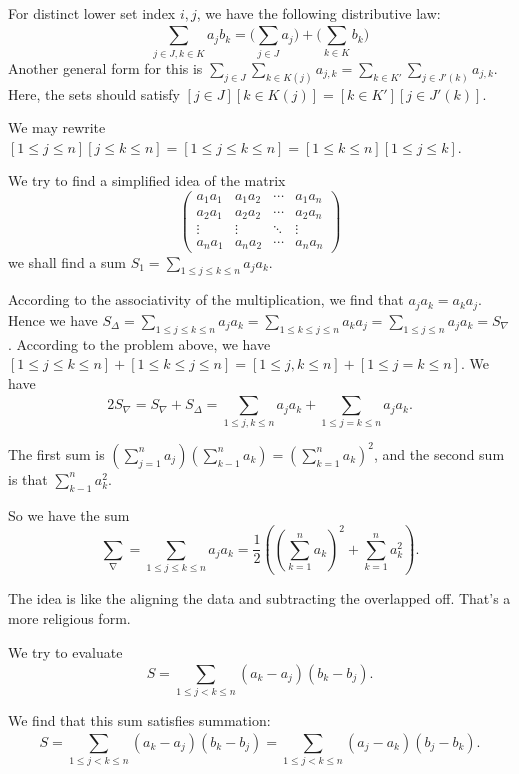  For distinct lower set index $i,j$, we have the
following distributive law: 
\[
    \sum_{j\in J,k\in K}^{}a_jb_k = \big( \sum_{j\in J}^{}a_j \big) + \big(
    \sum_{k\in K}^{}b_k \big)
\]
Another general form for this is $\sum_{j\in J}^{}\sum_{k\in
K(j)}^{}a_{j,k}=\sum_{k \in K'}^{} \sum_{j\in J'(k)}^{}a_{j, k}$. Here, the sets
should satisfy $[j \in J][k \in K(j)] = [k \in K'][j \in J'(k)]. $

 We may rewrite $[1\leq j\leq n][j\leq
k\leq n] = [1\leq j\leq k\leq n] = [1\leq k\leq n][1\leq j\leq k]$. 

We try to find a simplified idea of the matrix
\[
    \left(\begin{matrix}
            a_1a_1& a_1a_2 & \cdots & a_1a_n \\
            a_2a_1&a_2a_2&\cdots & a_2a_n\\
            \vdots & \vdots & \ddots & \vdots \\
            a_na_1 & a_na_2&\cdots & a_na_n
    \end{matrix}\right)
\]
we shall find a sum $S_1 = \sum_{1\leq j\leq k\leq n}^{}a_ja_k$. 

According to the associativity of the multiplication, we find that $a_j a_k= a_k
a_j$. Hence we have $S_\Delta = \sum_{1\leq j\leq k\leq n}^{}a_ja_k =
\sum_{1\leq k\leq j\leq n}^{}a_ka_j=\sum_{1\leq j\leq n}^{}a_ja_k=S_\nabla$.
According to the problem above, we have $[1\leq j\leq k\leq n]+[1\leq k\leq
j\leq n]=[1\leq j,k\leq n]+[1\leq j=k\leq n]$. We have 
\[
    2S_\nabla = S_\nabla + S_\Delta = \sum_{1\leq j,k\leq n}^{}a_ja_k + 
    \sum_{1\leq j=k\leq n}^{} a_j a_k. 
\]

The first sum is $\left( \sum_{j=1}^{n}a_j \right) \left( \sum_{k-1}^{n} a_k \right) = \left( \sum_{k=1}^{n}a_k  \right)^2$, and the second sum is that $\sum_{k-1}^{n}a_k^2$. 

So we have the sum 
\[
    \sum_{\nabla}^{} = \sum_{1\leq j\leq k\leq n}^{}a_ja_k = \frac{1}{2} \left(
    \left( \sum_{k=1}^{n} a_k \right)^2 + \sum_{k=1}^{n}a_k^2\right).
\]

The idea is like the aligning the data and subtracting the overlapped off.
That's a more religious form. 

 We try to evaluate 
\[
    S=\sum_{1\leq j< k\leq n}^{} (a_k-a_j)(b_k-b_j).
\]

We find that this sum satisfies summation: 
\[
    S=\sum_{1\leq j< k\leq n}^{} (a_k-a_j)(b_k-b_j)=\sum_{1\leq j<k\leq n}^{}(a_j-a_k)(b_j-b_k).
\]

